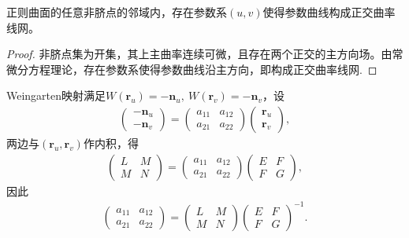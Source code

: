 \documentclass[../../main.tex]{subfiles}%
\begin{document}
\begin{theorem}
正则曲面的任意非脐点的邻域内，存在参数系$(u,v)$使得参数曲线构成正交曲率线网。
\end{theorem}
\begin{proof}
非脐点集为开集，其上主曲率连续可微，且存在两个正交的主方向场。由常微分方程理论，存在参数系使得参数曲线沿主方向，即构成正交曲率线网.
\end{proof}


Weingarten映射满足$W(\boldsymbol{r}_u)=-\boldsymbol{n}_u,\ W(\boldsymbol{r}_v)=-\boldsymbol{n}_v$，设
\begin{align}
\begin{pmatrix}
-\boldsymbol{n}_u\\
-\boldsymbol{n}_v
\end{pmatrix}=
\begin{pmatrix}
a_{11} & a_{12}\\
a_{21} & a_{22}
\end{pmatrix}
\begin{pmatrix}
\boldsymbol{r}_u\\
\boldsymbol{r}_v
\end{pmatrix},\label{eq:weingarten_matrix_def}
\end{align}
两边与$(\boldsymbol{r}_u,\boldsymbol{r}_v)$作内积，得
\begin{align*}
\begin{pmatrix}
L & M\\
M & N
\end{pmatrix}=
\begin{pmatrix}
a_{11} & a_{12}\\
a_{21} & a_{22}
\end{pmatrix}
\begin{pmatrix}
E & F\\
F & G
\end{pmatrix},
\end{align*}
因此
\begin{align}
\begin{pmatrix}
a_{11} & a_{12}\\
a_{21} & a_{22}
\end{pmatrix}=
\begin{pmatrix}
L & M\\
M & N
\end{pmatrix}
\begin{pmatrix}
E & F\\
F & G
\end{pmatrix}^{-1}.\label{eq:weingarten_matrix_formula}
\end{align}
\end{document}

